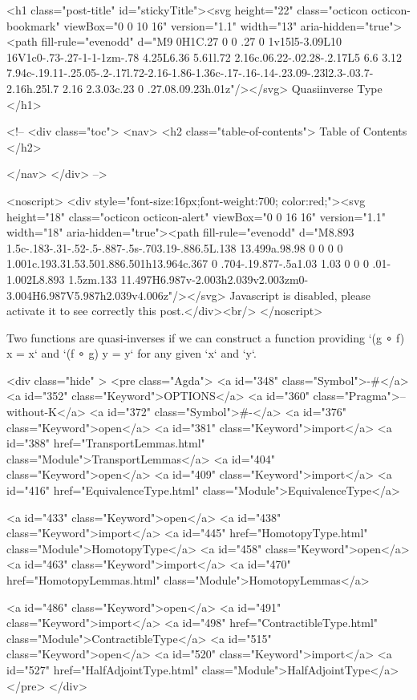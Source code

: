   <h1 class="post-title" id="stickyTitle"><svg height="22" class="octicon octicon-bookmark" viewBox="0 0 10 16" version="1.1" width="13" aria-hidden="true"><path fill-rule="evenodd" d="M9 0H1C.27 0 0 .27 0 1v15l5-3.09L10 16V1c0-.73-.27-1-1-1zm-.78 4.25L6.36 5.61l.72 2.16c.06.22-.02.28-.2.17L5 6.6 3.12 7.94c-.19.11-.25.05-.2-.17l.72-2.16-1.86-1.36c-.17-.16-.14-.23.09-.23l2.3-.03.7-2.16h.25l.7 2.16 2.3.03c.23 0 .27.08.09.23h.01z"/></svg> Quasiinverse Type
  </h1>

  <!-- 
  <div class="toc">
    <nav>
    <h2 class="table-of-contents"> Table of Contents </h2>
      

    </nav>
  </div>
   -->

  <noscript>
  <div style="font-size:16px;font-weight:700; color:red;"><svg height="18" class="octicon octicon-alert" viewBox="0 0 16 16" version="1.1" width="18" aria-hidden="true"><path fill-rule="evenodd" d="M8.893 1.5c-.183-.31-.52-.5-.887-.5s-.703.19-.886.5L.138 13.499a.98.98 0 0 0 0 1.001c.193.31.53.501.886.501h13.964c.367 0 .704-.19.877-.5a1.03 1.03 0 0 0 .01-1.002L8.893 1.5zm.133 11.497H6.987v-2.003h2.039v2.003zm0-3.004H6.987V5.987h2.039v4.006z"/></svg> Javascript is disabled, please activate it to see correctly this post.</div><br/>
  </noscript>

  Two functions are quasi-inverses if we can construct a function providing
`(g ∘ f) x = x` and `(f ∘ g) y = y` for any given `x` and `y`.

<div class="hide" >
<pre class="Agda">
<a id="348" class="Symbol">{-#</a> <a id="352" class="Keyword">OPTIONS</a> <a id="360" class="Pragma">--without-K</a> <a id="372" class="Symbol">#-}</a>
<a id="376" class="Keyword">open</a> <a id="381" class="Keyword">import</a> <a id="388" href="TransportLemmas.html" class="Module">TransportLemmas</a>
<a id="404" class="Keyword">open</a> <a id="409" class="Keyword">import</a> <a id="416" href="EquivalenceType.html" class="Module">EquivalenceType</a>

<a id="433" class="Keyword">open</a> <a id="438" class="Keyword">import</a> <a id="445" href="HomotopyType.html" class="Module">HomotopyType</a>
<a id="458" class="Keyword">open</a> <a id="463" class="Keyword">import</a> <a id="470" href="HomotopyLemmas.html" class="Module">HomotopyLemmas</a>

<a id="486" class="Keyword">open</a> <a id="491" class="Keyword">import</a> <a id="498" href="ContractibleType.html" class="Module">ContractibleType</a>
<a id="515" class="Keyword">open</a> <a id="520" class="Keyword">import</a> <a id="527" href="HalfAdjointType.html" class="Module">HalfAdjointType</a>
</pre>
</div>

